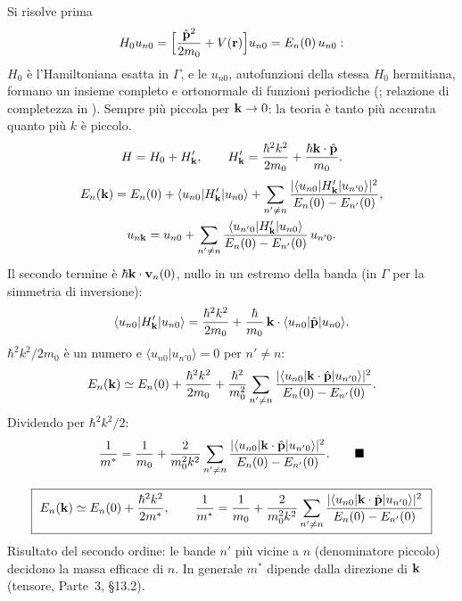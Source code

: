 \documentclass[11pt,a4paper]{article}
\begin{document}
\begin{dimostrazione}
Si risolve prima
\[
H_0u_{n0}=\Bigl[\frac{\hat{\mathbf p}^2}{2m_0}+V(\mathbf r)\Bigr]u_{n0}=E_n(0)\,u_{n0}:
\]
$H_0$ è l'Hamiltoniana esatta in $\Gamma$, e le $u_{n0}$, autofunzioni della stessa $H_0$ hermitiana, formano un insieme completo e ortonormale di
funzioni periodiche (; relazione di completezza in ).
Sempre più piccola per $\mathbf k\to0$: la teoria è tanto più accurata quanto più $k$ è piccolo.
\[
H=H_0+H'_{\mathbf k},\qquad H'_{\mathbf k}=\frac{\hbar^2k^2}{2m_0}+\frac{\hbar\mathbf k\cdot\hat{\mathbf p}}{m_0}.
\]
\begin{gather*}
E_n(\mathbf k)=E_n(0)+\langle u_{n0}|H'_{\mathbf k}|u_{n0}\rangle+\sum_{n'\ne n}\frac{|\langle u_{n0}|H'_{\mathbf k}|u_{n'0}\rangle|^2}{E_n(0)-E_{n'}(0)},\\
u_{n\mathbf k}=u_{n0}+\sum_{n'\ne n}\frac{\langle u_{n'0}|H'_{\mathbf k}|u_{n0}\rangle}{E_n(0)-E_{n'}(0)}\,u_{n'0}.
\end{gather*}
Il secondo termine è $\hbar\mathbf k\cdot\mathbf v_n(0)$, nullo in un estremo della banda (in $\Gamma$ per la simmetria di inversione):
\[
\langle u_{n0}|H'_{\mathbf k}|u_{n0}\rangle=\frac{\hbar^2k^2}{2m_0}+\frac\hbar{m_0}\,\mathbf k\cdot\langle u_{n0}|\hat{\mathbf p}|u_{n0}\rangle .
\]
$\hbar^2k^2/2m_0$ è un numero e $\langle u_{n0}|u_{n'0}\rangle=0$ per $n'\ne n$:
\[
E_n(\mathbf k)\simeq E_n(0)+\frac{\hbar^2k^2}{2m_0}+\frac{\hbar^2}{m_0^2}\sum_{n'\ne n}\frac{|\langle u_{n0}|\mathbf k\cdot\hat{\mathbf p}|u_{n'0}\rangle|^2}{E_n(0)-E_{n'}(0)} .
\]
Dividendo per $\hbar^2k^2/2$:
\[
\frac1{m^*}=\frac1{m_0}+\frac2{m_0^2k^2}\sum_{n'\ne n}\frac{|\langle u_{n0}|\vk\cdot\hp|u_{n'0}\rangle|^2}{E_n(0)-E_{n'}(0)} .\qed
\]
\end{dimostrazione}

\begin{chiave}
\[
\boxed{\ E_n(\mathbf k)\simeq E_n(0)+\frac{\hbar^2k^2}{2m^*},\qquad
\frac1{m^*}=\frac1{m_0}+\frac2{m_0^2k^2}\sum_{n'\ne n}\frac{|\langle u_{n0}|\mathbf k\cdot\hat{\mathbf p}|u_{n'0}\rangle|^2}{E_n(0)-E_{n'}(0)}\ }
\]
Risultato del secondo ordine: le bande $n'$ più vicine a $n$ (denominatore piccolo) decidono la massa efficace di $n$. In generale $m^*$ dipende dalla
direzione di $\mathbf k$ (tensore, Parte~3, §13.2).
\end{chiave}
\end{document}
